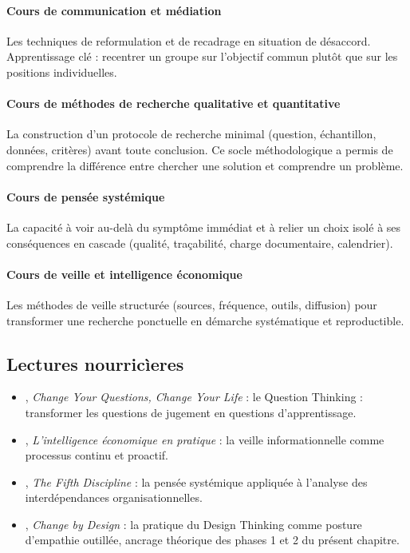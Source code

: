 \paragraph{Cours de communication et médiation}
Les techniques de reformulation et de recadrage en situation de désaccord. Apprentissage clé : recentrer un groupe sur l'objectif commun plutôt que sur les positions individuelles.

\paragraph{Cours de méthodes de recherche qualitative et quantitative}
La construction d'un protocole de recherche minimal (question, échantillon, données, critères) avant toute conclusion. Ce socle méthodologique a permis de comprendre la différence entre chercher une solution et comprendre un problème.

\paragraph{Cours de pensée systémique}
La capacité à voir au-delà du symptôme immédiat et à relier un choix isolé à ses conséquences en cascade (qualité, traçabilité, charge documentaire, calendrier).

\paragraph{Cours de veille et intelligence économique}
Les méthodes de veille structurée (sources, fréquence, outils, diffusion) pour transformer une recherche ponctuelle en démarche systématique et reproductible.

\subsection{Lectures nourric\`ieres}

\begin{itemize}
  \item \textbf{\citet{adams2004}}, \textit{Change Your Questions, Change Your Life} : le Question Thinking : transformer les questions de jugement en questions d'apprentissage.
  \item \textbf{\citet{jakobiak1998}}, \textit{L'intelligence économique en pratique} : la veille informationnelle comme processus continu et proactif.
  \item \textbf{\citet{senge1990}}, \textit{The Fifth Discipline} : la pensée systémique appliquée à l'analyse des interdépendances organisationnelles.
  \item \textbf{\citet{brown2009}}, \textit{Change by Design} : la pratique du Design Thinking comme posture d'empathie outillée, ancrage théorique des phases 1 et 2 du présent chapitre.
\end{itemize}

